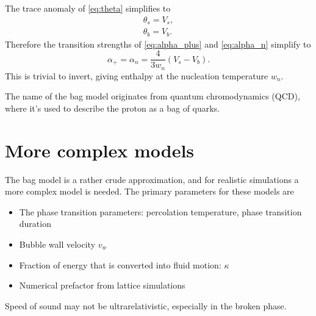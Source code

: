 The trace anomaly of \eqref{eq:theta} simplifies to
\begin{align}
\theta_s = V_s, \\
\theta_b = V_b.
\end{align}
Therefore the transition strengths of \eqref{eq:alpha_plus} and \eqref{eq:alpha_n} simplify to
\begin{equation}
\alpha_+ = \alpha_n = \frac{4}{3 w_n} (V_s - V_b).
\label{eq:alpha_n_bag}
\end{equation}
This is trivial to invert, giving enthalpy at the nucleation temperature $w_n$.

The name of the bag model originates from quantum chromodynamics (QCD), where it's used to describe the proton as a bag of quarks.


\section{More complex models}
The bag model is a rather crude approximation, and for realistic simulations a more complex model is needed.
The primary parameters for these models are
\begin{itemize}
    \item The phase transition parameters: percolation temperature, phase transition duration
    \item Bubble wall velocity $v_w$
    \item Fraction of energy that is converted into fluid motion: $\kappa$
    \item Numerical prefactor from lattice simulations
\end{itemize}

Speed of sound may not be ultrarelativistic, especially in the broken phase.

